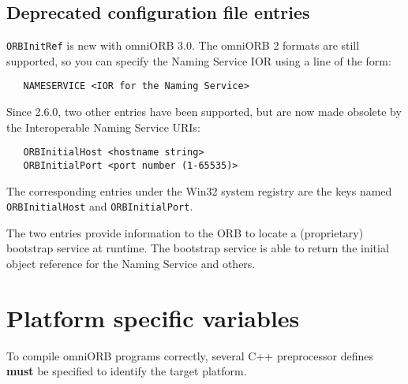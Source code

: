 \documentclass[11pt,twoside,a4paper]{book}
\begin{document}
\subsection{Deprecated configuration file entries}

\texttt{ORBInitRef} is new with omniORB 3.0. The omniORB 2 formats are
still supported, so you can specify the Naming Service IOR using a
line of the form:

\begin{verbatim}
   NAMESERVICE <IOR for the Naming Service>
\end{verbatim}

Since 2.6.0, two other entries have been supported, but are now made
obsolete by the Interoperable Naming Service URIs:

\begin{verbatim}
   ORBInitialHost <hostname string>
   ORBInitialPort <port number (1-65535)>
\end{verbatim}

The corresponding entries under the Win32 system registry are the keys
named \texttt{ORBInitialHost} and \texttt{ORBInitialPort}.

The two entries provide information to the ORB to locate a
(proprietary) bootstrap service at runtime. The bootstrap service is
able to return the initial object reference for the Naming Service and
others.


\section{Platform specific variables}

To compile omniORB programs correctly, several C++ preprocessor defines
\textbf{must} be specified to identify the target platform.
\end{document}
